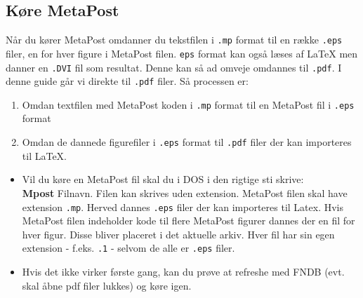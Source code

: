 \documentclass{article}
\begin{document}
\subsection{Køre MetaPost}
Når du kører MetaPost omdanner du tekstfilen i \verb".mp" format til en række \verb".eps" filer, en for hver figure i MetaPost filen. \verb"eps" format kan også læses af \LaTeX{} men danner en \verb".DVI" fil som resultat. Denne kan så ad omveje omdannes til \verb".pdf". I denne guide går vi direkte til \verb".pdf" filer. Så processen er:
\begin{enumerate}
\item Omdan textfilen med MetaPost koden i \verb".mp" format til en MetaPost fil i \verb".eps" format
\item Omdan de dannede figurefiler i \verb".eps" format til \verb".pdf" filer der kan importeres til \LaTeX{}.
\end{enumerate}
\begin{itemize}
\item Vil du køre en MetaPost fil skal du i DOS i den rigtige sti skrive:\\
\textbf{Mpost} Filnavn.
Filen kan skrives uden extension. MetaPost filen skal have extension \verb".mp".
Herved dannes \verb".eps" filer der kan importeres til Latex. Hvis MetaPost filen indeholder kode til flere MetaPost figurer dannes der en fil for hver figur. Disse bliver placeret i det aktuelle arkiv. Hver fil har sin egen extension - f.eks. \verb".1" - selvom de alle er \verb".eps" filer.
\item Hvis det ikke virker første gang, kan du prøve at refreshe med FNDB (evt. skal åbne pdf filer lukkes) og køre igen.
\end{itemize}
\end{document}
